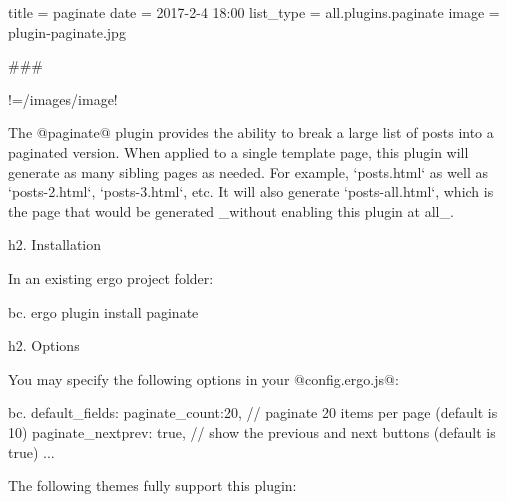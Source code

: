 title = paginate
date = 2017-2-4 18:00
list_type = all.plugins.paginate
image = plugin-paginate.jpg

###

!=/images/{{image}}!

The @paginate@ plugin provides the ability to break a large list of posts into a paginated version. When applied to a single template page, this plugin will generate as many sibling pages as needed. For example, `posts.html` as well as `posts-2.html`, `posts-3.html`, etc. It will also generate `posts-all.html`, which is the page that would be generated _without enabling this plugin at all_.

h2. Installation

In an existing ergo project folder:

bc. ergo plugin install paginate


h2. Options 

You may specify the following options in your @config.ergo.js@:

bc.
default_fields: {
	paginate_count:20, // paginate 20 items per page (default is 10)
	paginate_nextprev: true, // show the previous and next buttons (default is true)
	...
}



The following themes fully support this plugin:



